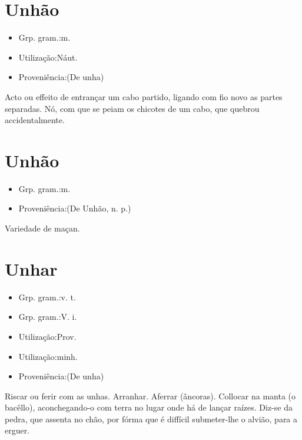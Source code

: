 \documentclass{article}
\begin{document}
\section{Unhão}
\begin{itemize}
\item {Grp. gram.:m.}
\end{itemize}
\begin{itemize}
\item {Utilização:Náut.}
\end{itemize}
\begin{itemize}
\item {Proveniência:(De \textunderscore unha\textunderscore )}
\end{itemize}
Acto ou effeito de entrançar um cabo partido, ligando com fio novo as partes separadas.
Nó, com que se peiam os chicotes de um cabo, que quebrou accidentalmente.
\section{Unhão}
\begin{itemize}
\item {Grp. gram.:m.}
\end{itemize}
\begin{itemize}
\item {Proveniência:(De \textunderscore Unhão\textunderscore , n. p.)}
\end{itemize}
Variedade de maçan.
\section{Unhar}
\begin{itemize}
\item {Grp. gram.:v. t.}
\end{itemize}
\begin{itemize}
\item {Grp. gram.:V. i.}
\end{itemize}
\begin{itemize}
\item {Utilização:Prov.}
\end{itemize}
\begin{itemize}
\item {Utilização:minh.}
\end{itemize}
\begin{itemize}
\item {Proveniência:(De \textunderscore unha\textunderscore )}
\end{itemize}
Riscar ou ferir com as unhas.
Arranhar.
Aferrar (âncoras).
Collocar na manta (o bacêllo), aconchegando-o com terra no lugar onde há de lançar raízes.
Diz-se da pedra, que assenta no chão, por fórma que é diffícil submeter-lhe o alvião, para a erguer.
\end{document}
